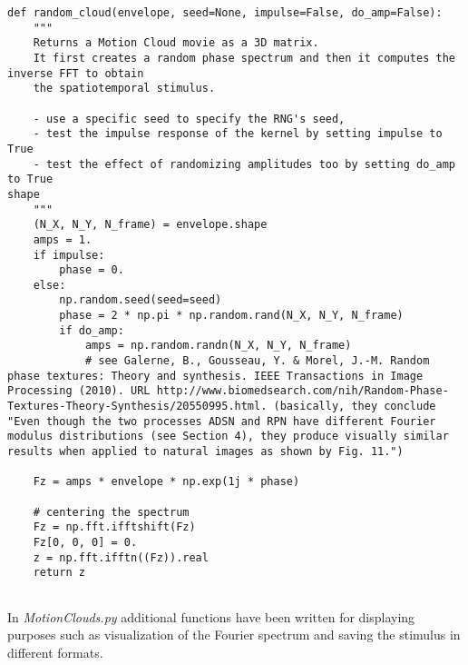 \documentclass[a4paper,11pt]{article}%
\begin{document}
\begin{lstlisting}
def random_cloud(envelope, seed=None, impulse=False, do_amp=False):
    """
    Returns a Motion Cloud movie as a 3D matrix.
    It first creates a random phase spectrum and then it computes the inverse FFT to obtain
    the spatiotemporal stimulus.

    - use a specific seed to specify the RNG's seed,
    - test the impulse response of the kernel by setting impulse to True
    - test the effect of randomizing amplitudes too by setting do_amp to True
shape
    """
    (N_X, N_Y, N_frame) = envelope.shape
    amps = 1.
    if impulse:
        phase = 0.
    else:
        np.random.seed(seed=seed)
        phase = 2 * np.pi * np.random.rand(N_X, N_Y, N_frame)
        if do_amp:
            amps = np.random.randn(N_X, N_Y, N_frame)
            # see Galerne, B., Gousseau, Y. & Morel, J.-M. Random phase textures: Theory and synthesis. IEEE Transactions in Image Processing (2010). URL http://www.biomedsearch.com/nih/Random-Phase-Textures-Theory-Synthesis/20550995.html. (basically, they conclude "Even though the two processes ADSN and RPN have different Fourier modulus distributions (see Section 4), they produce visually similar results when applied to natural images as shown by Fig. 11.")

    Fz = amps * envelope * np.exp(1j * phase)

    # centering the spectrum
    Fz = np.fft.ifftshift(Fz)
    Fz[0, 0, 0] = 0.
    z = np.fft.ifftn((Fz)).real
    return z


\end{lstlisting}

In \textit{MotionClouds.py} additional functions have been written for displaying purposes such as visualization of the Fourier spectrum and saving the stimulus in different formats.
\end{document}
